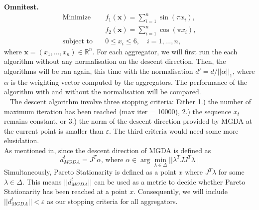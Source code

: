 \documentclass{article}
\renewcommand{\epsilon}{\varepsilon}
\renewcommand{\|}{\biggr|}
\begin{document}
    \textbf{Omnitest.} 
    \begin{align*}
    \text{Minimize} \quad & f_1(\mathbf{x}) = \sum_{i=1}^n \sin(\pi x_i), \\
    & f_2(\mathbf{x}) = \sum_{i=1}^n \cos(\pi x_i), \\
    \text{subject to} \quad & 0 \leq x_i \leq 6, \quad i = 1, \dots, n,
    \end{align*}
    where \(\mathbf{x} = (x_1, \dots, x_n) \in \mathbb{R}^n\).
    For each aggregator, we will first run the each algorithm without any normalisation on the descent direction. Then, the algorithms will be ran again, this time with the normalisation $d' = d / ||\alpha||_1$, where $\alpha$ is the weighting vector computed by the aggregators. The performance of the algorithm with and without the normalisation will be compared.\\
    ~
    The descent algorithm involve three stopping criteria: Either 1.) the number of maximum iteration has been reached (max iter = 10000), 2.) the sequence $x_t$ remains constant, or 3.) the norm of the descent direction provided by MGDA at the current point is smaller than $\epsilon$. The third criteria would need some more elusidation.\\
    As mentioned in, since the descent direction of MGDA is defined as
    \begin{equation*}
        d^t_{MGDA} = J^T \alpha\text{, where }\alpha \in\arg\min_{\lambda\in\Delta}||\lambda^T JJ^T\lambda||
    \end{equation*}
    Simultaneously, Pareto Stationarity is defined as a point $x$ where $J^T\lambda$ for some $\lambda\in \Delta$. This means $||d^t_{MGDA}||$ can be used as a metric to decide whether Pareto Stationarity has been reached at a point $x$. Consequently, we will include $||d^t_{MGDA}|| < \epsilon$ as our stopping criteria for all aggregators. 
\end{document}
